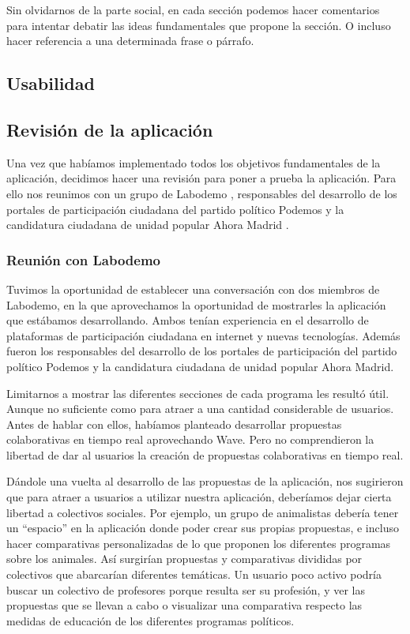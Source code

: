 Sin olvidarnos de la parte social, en cada sección podemos hacer comentarios para intentar debatir las ideas fundamentales que propone la sección. O incluso hacer referencia a una determinada frase o párrafo.
\subsection{Usabilidad}

\subsection{Revisión de la aplicación}
Una vez que habíamos implementado todos los objetivos fundamentales de la aplicación, decidimos hacer una revisión para poner a prueba la aplicación. Para ello nos reunimos con un grupo de Labodemo \cite{ref:labodemo}, responsables del desarrollo de los portales de participación ciudadana del partido político Podemos \cite{ref:podemos} y la candidatura ciudadana de unidad popular Ahora Madrid \cite{ref:ahoramadrid}.

\subsubsection{Reunión con Labodemo}
Tuvimos la oportunidad de establecer una conversación con dos miembros de Labodemo, en la que aprovechamos la oportunidad de mostrarles la aplicación que estábamos desarrollando. Ambos tenían experiencia en el desarrollo de plataformas de participación ciudadana en internet y nuevas tecnologías. Además fueron los responsables del desarrollo de los portales de participación del partido político Podemos y la candidatura ciudadana de unidad popular Ahora Madrid.

Limitarnos a mostrar las diferentes secciones de cada programa les resultó útil. Aunque no suficiente como para atraer a una cantidad considerable de usuarios. Antes de hablar con ellos, habíamos planteado desarrollar propuestas colaborativas en tiempo real aprovechando Wave. Pero no comprendieron la libertad de dar al usuarios la creación de propuestas colaborativas en tiempo real.

Dándole una vuelta al desarrollo de las propuestas de la aplicación, nos sugirieron que para atraer a usuarios a utilizar nuestra aplicación, deberíamos dejar cierta libertad a colectivos sociales. Por ejemplo, un grupo de animalistas debería tener un “espacio” en la aplicación donde poder crear sus propias propuestas, e incluso hacer comparativas personalizadas de lo que proponen los diferentes programas sobre los animales. Así surgirían propuestas y comparativas divididas por colectivos que abarcarían diferentes temáticas. Un usuario poco activo podría buscar un colectivo de profesores porque resulta ser su profesión, y ver las propuestas que se llevan a cabo o visualizar una comparativa respecto las medidas de educación de los diferentes programas políticos.

